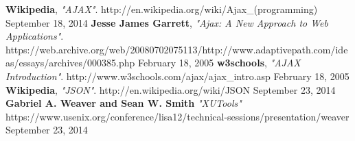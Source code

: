 \begin{thebibliography}{99}

   \textbf{Wikipedia},
   \emph{"AJAX"}.
   http://en.wikipedia.org/wiki/Ajax\_(programming)
   September 18, 2014 
   \textbf{Jesse James Garrett},
   \emph{"Ajax: A New Approach to Web Applications"}.
   https://web.archive.org/web/20080702075113/http://www.adaptivepath.com/ideas/essays/archives/000385.php
   February 18, 2005
   \textbf{w3schools},
   \emph{"AJAX Introduction"}.
   http://www.w3schools.com/ajax/ajax\_intro.asp
   February 18, 2005
   \textbf{Wikipedia},
   \emph{"JSON"}.
   http://en.wikipedia.org/wiki/JSON
   September 23, 2014
   \textbf{Gabriel A. Weaver and Sean W. Smith}
   \emph{"XUTools"}
   https://www.usenix.org/conference/lisa12/technical-sessions/presentation/weaver
   September 23, 2014
\end{thebibliography}
